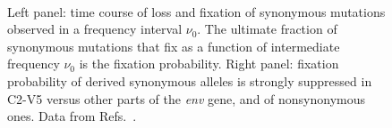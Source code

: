 \documentclass[rmp, twocolumn]{revtex4}
\begin{document}
\begin{figure}
\begin{center}
\\
\caption{Left panel: time course of loss and fixation of synonymous mutations
 observed in a frequency interval $\nu_0$. The ultimate fraction of synonymous
 mutations that fix as a function of intermediate frequency $\nu_0$ is the
 fixation probability.  Right panel: fixation probability of derived synonymous
alleles is strongly suppressed in C2-V5 versus other parts of the {\it env}
gene, and of nonsynonymous ones. Data from
Refs.~\cite{shankarappa_consistent_1999, bunnik_autologous_2008}.}
\label{fig:fixp}
\end{center}
\end{figure}
\end{document}
